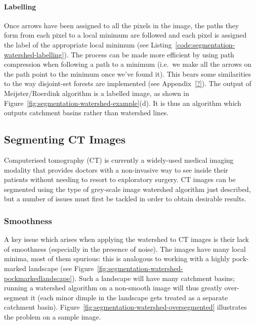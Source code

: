 \paragraph{Labelling}

Once arrows have been assigned to all the pixels in the image, the paths they form from each pixel to a local minimum are followed and each pixel is assigned the label of the appropriate local minimum (see Listing~\ref{code:segmentation-watershed-labelling}). The process can be made more efficient by using path compression when following a path to a minimum (i.e.~we make all the arrows on the path point to the minimum once we've found it). This bears some similarities to the way disjoint-set forests are implemented (see Appendix~\ref{?}). The output of Meijster/Roerdink algorithm is a labelled image, as shown in Figure~\ref{fig:segmentation-watershed-example}(d). It is thus an algorithm which outputs catchment basins rather than watershed lines.

\subsection{Segmenting CT Images}

Computerised tomography (CT) is currently a widely-used medical imaging modality \cite{garvey02} that provides doctors with a non-invasive way to see inside their patients without needing to resort to exploratory surgery. CT images can be segmented using the type of grey-scale image watershed algorithm just described, but a number of issues must first be tackled in order to obtain desirable results.

\subsubsection{Smoothness}

A key issue which arises when applying the watershed to CT images is their lack of smoothness (especially in the presence of noise). The images have many local minima, most of them spurious: this is analogous to working with a highly pock-marked landscape (see Figure~\ref{fig:segmentation-watershed-pockmarkedlandscape}). Such a landscape will have many catchment basins; running a watershed algorithm on a non-smooth image will thus greatly over-segment it (each minor dimple in the landscape gets treated as a separate catchment basin). Figure~\ref{fig:segmentation-watershed-oversegmented} illustrates the problem on a sample image.

